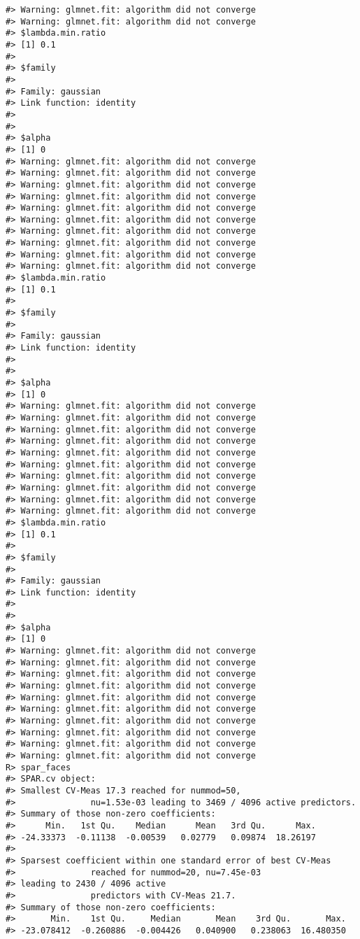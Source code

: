 \documentclass[
  article]{jss}
\begin{document}
\begin{verbatim}
#> Warning: glmnet.fit: algorithm did not converge
#> Warning: glmnet.fit: algorithm did not converge
#> $lambda.min.ratio
#> [1] 0.1
#> 
#> $family
#> 
#> Family: gaussian 
#> Link function: identity 
#> 
#> 
#> $alpha
#> [1] 0
#> Warning: glmnet.fit: algorithm did not converge
#> Warning: glmnet.fit: algorithm did not converge
#> Warning: glmnet.fit: algorithm did not converge
#> Warning: glmnet.fit: algorithm did not converge
#> Warning: glmnet.fit: algorithm did not converge
#> Warning: glmnet.fit: algorithm did not converge
#> Warning: glmnet.fit: algorithm did not converge
#> Warning: glmnet.fit: algorithm did not converge
#> Warning: glmnet.fit: algorithm did not converge
#> Warning: glmnet.fit: algorithm did not converge
#> $lambda.min.ratio
#> [1] 0.1
#> 
#> $family
#> 
#> Family: gaussian 
#> Link function: identity 
#> 
#> 
#> $alpha
#> [1] 0
#> Warning: glmnet.fit: algorithm did not converge
#> Warning: glmnet.fit: algorithm did not converge
#> Warning: glmnet.fit: algorithm did not converge
#> Warning: glmnet.fit: algorithm did not converge
#> Warning: glmnet.fit: algorithm did not converge
#> Warning: glmnet.fit: algorithm did not converge
#> Warning: glmnet.fit: algorithm did not converge
#> Warning: glmnet.fit: algorithm did not converge
#> Warning: glmnet.fit: algorithm did not converge
#> Warning: glmnet.fit: algorithm did not converge
#> $lambda.min.ratio
#> [1] 0.1
#> 
#> $family
#> 
#> Family: gaussian 
#> Link function: identity 
#> 
#> 
#> $alpha
#> [1] 0
#> Warning: glmnet.fit: algorithm did not converge
#> Warning: glmnet.fit: algorithm did not converge
#> Warning: glmnet.fit: algorithm did not converge
#> Warning: glmnet.fit: algorithm did not converge
#> Warning: glmnet.fit: algorithm did not converge
#> Warning: glmnet.fit: algorithm did not converge
#> Warning: glmnet.fit: algorithm did not converge
#> Warning: glmnet.fit: algorithm did not converge
#> Warning: glmnet.fit: algorithm did not converge
#> Warning: glmnet.fit: algorithm did not converge
R> spar_faces
#> SPAR.cv object:
#> Smallest CV-Meas 17.3 reached for nummod=50,
#>               nu=1.53e-03 leading to 3469 / 4096 active predictors.
#> Summary of those non-zero coefficients:
#>      Min.   1st Qu.    Median      Mean   3rd Qu.      Max. 
#> -24.33373  -0.11138  -0.00539   0.02779   0.09874  18.26197 
#> 
#> Sparsest coefficient within one standard error of best CV-Meas
#>               reached for nummod=20, nu=7.45e-03 
#> leading to 2430 / 4096 active
#>               predictors with CV-Meas 21.7.
#> Summary of those non-zero coefficients:
#>       Min.    1st Qu.     Median       Mean    3rd Qu.       Max. 
#> -23.078412  -0.260886  -0.004426   0.040900   0.238063  16.480350
\end{verbatim}
\end{document}
